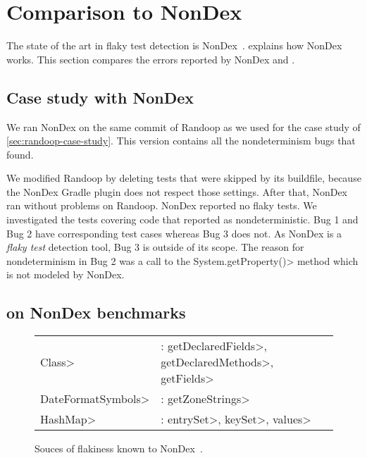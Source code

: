 \section{Comparison to NonDex}

The state of the art in flaky test detection is NonDex~\cite{nondex}.
 explains how NonDex works. This section compares the
errors reported by NonDex and \theDeterminismChecker.

\subsection{Case study with NonDex}\label{sec:nondex-randoop}

We ran NonDex on the same commit of Randoop as we used for the case study
of \cref{sec:randoop-case-study}.  This version contains all the nondeterminism bugs that
\theDeterminismChecker found.

We modified Randoop by deleting tests that were skipped by its buildfile,
because the NonDex Gradle plugin does not respect those settings.
After that, NonDex ran without problems on Randoop.
NonDex reported no flaky tests.
We investigated the tests covering code that \theDeterminismChecker reported as nondeterministic.
Bug 1 and Bug 2 have corresponding test cases whereas Bug 3 does not.
As NonDex is a \textit{flaky test} detection tool, Bug 3 is outside of its scope.
The reason for nondeterminism in Bug 2 was a call to the \<System.getProperty()> method which
is not modeled by NonDex.


\subsection{\TheDeterminismChecker on NonDex benchmarks}\label{sec:nondex-benchmarks}

\begin{figure}
    \begin{tabular}{lll}
        \<Class> & : \<getDeclaredFields>, \<getDeclaredMethods>, \<getFields> \\
        \<DateFormatSymbols> & : \<getZoneStrings> \\
        \<HashMap> & : \<entrySet>, \<keySet>, \<values>
    \end{tabular}
\caption{Souces of flakiness known to NonDex~\cite{nondex}.}
\label{fig:flaky-sources}
\end{figure}

